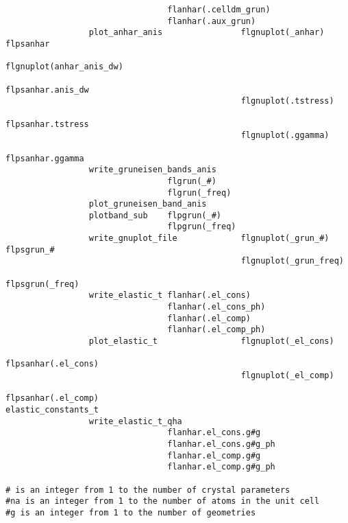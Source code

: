 \documentclass[12pt,a4paper]{article}
\begin{document}
\begin{verbatim}
                                 flanhar(.celldm_grun)
                                 flanhar(.aux_grun)
                 plot_anhar_anis                flgnuplot(_anhar)   flpsanhar
                                                flgnuplot(anhar_anis_dw) 
                                                            flpsanhar.anis_dw
                                                flgnuplot(.tstress)  
                                                            flpsanhar.tstress
                                                flgnuplot(.ggamma)  
                                                            flpsanhar.ggamma
                 write_gruneisen_bands_anis
                                 flgrun(_#)
                                 flgrun(_freq)
                 plot_gruneisen_band_anis
                 plotband_sub    flpgrun(_#)
                                 flpgrun(_freq)
                 write_gnuplot_file             flgnuplot(_grun_#)   flpsgrun_#
                                                flgnuplot(_grun_freq) 
                                                                 flpsgrun(_freq)
                 write_elastic_t flanhar(.el_cons)
                                 flanhar(.el_cons_ph)
                                 flanhar(.el_comp)
                                 flanhar(.el_comp_ph)
                 plot_elastic_t                 flgnuplot(_el_cons)  
                                                           flpsanhar(.el_cons)
                                                flgnuplot(_el_comp)  
                                                           flpsanhar(.el_comp)
elastic_constants_t
                 write_elastic_t_qha
                                 flanhar.el_cons.g#g
                                 flanhar.el_cons.g#g_ph
                                 flanhar.el_comp.g#g
                                 flanhar.el_comp.g#g_ph

# is an integer from 1 to the number of crystal parameters
#na is an integer from 1 to the number of atoms in the unit cell
#g is an integer from 1 to the number of geometries
\end{verbatim} 

\newpage
\end{document}
